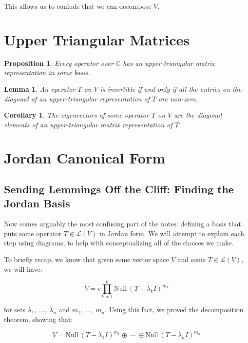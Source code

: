 \documentclass[10pt, oneside]{article}
\newtheorem{lem}{Lemma}
\newtheorem{cor}{Corollary}
\newtheorem{prop}{Proposition}
\begin{document}
   This allows us to conlude that we can decompose $V$.

   \section{Upper Triangular Matrices}

   \begin{prop}
     Every operator over $\mathbb{C}$ has an upper-triangular matrix representation in some basis.
   \end{prop}

   \begin{lem}
     An operator $T$ on $V$ is invertible if and only if all the entries on the diagonal of an
     upper-triangular representation of $T$ are non-zero.
     \end{lem}

   \begin{cor}
     The eigenvectors of some operator $T$ on $V$ are the diagonal elements of an
     upper-triangular matrix representation of $T$
     \end{cor}

   \section{Jordan Canonical Form}

   \subsection{Sending Lemmings Off the Cliff: Finding the Jordan Basis}

   Now comes arguably the most confusing part of the notes: defining a basis that puts some operator
   $T \in \mathcal{L}(V)$ in Jordan form. We will attempt to explain each step using diagrams, to help
   with conceptualizing all of the choices we make.
   \newline

   To briefly recap, we know that given some vector space $V$ and some $T \in \mathcal{L}(V)$, we will have:

   $$V = c \displaystyle\prod_{k = 1}^{n} \text{Null} \ (T - \lambda_k I)^{m_k}$$

   for sets $\lambda_1, \ ..., \ \lambda_n$ and $m_1, \ ..., \ m_n$. Using this fact, we proved the
   decomposition theorem, showing that:

   $$V = \text{Null} \ (T - \lambda_1 I)^{m_1} \oplus \ \cdots \ \oplus \text{Null} \ (T - \lambda_n I)^{m_n}$$
\end{document}
